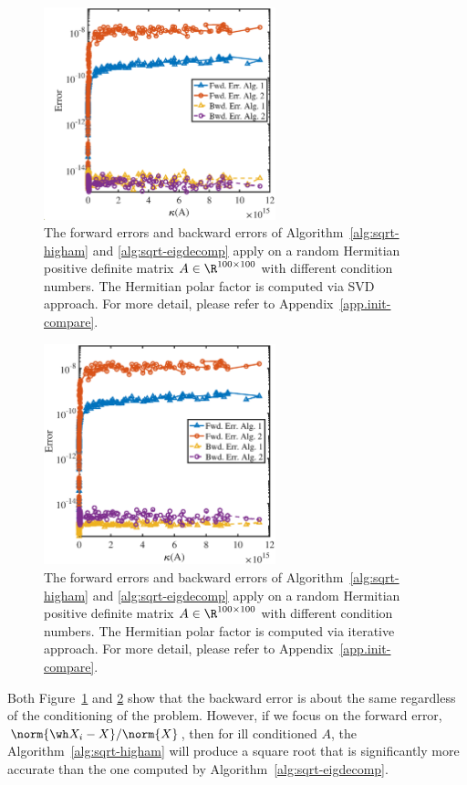 \begin{figure}[h]
\centering
\includegraphics[width=0.6\textwidth]{figs/init_comp_svd_eig.eps}
\caption[Behavior of forward and backward errors of computed square
root.]{
  The forward errors and backward errors of
  Algorithm~\ref{alg:sqrt-higham} and \ref{alg:sqrt-eigdecomp} apply on a
  random Hermitian positive definite matrix $A\in\R^{100\times 100}$ with
  different condition numbers.
  The Hermitian polar factor is computed via SVD approach.
  For more detail, please refer to Appendix~\ref{app.init-compare}.}
\label{fig.init-compare-svd}
\end{figure}

\begin{figure}[h]
\centering
\includegraphics[width=0.6\textwidth]{figs/init_comp_newton_eig.eps}
\caption[Behavior of forward and backward errors of computed square
root.]{
  The forward errors and backward errors of
  Algorithm~\ref{alg:sqrt-higham} and \ref{alg:sqrt-eigdecomp} apply on a
  random Hermitian positive definite matrix $A\in\R^{100\times 100}$ with
  different condition numbers.
  The Hermitian polar factor is computed via iterative approach.
  For more detail, please refer to Appendix~\ref{app.init-compare}.}
\label{fig.init-compare-newton}
\end{figure}

Both Figure~\ref{fig.init-compare-svd} and \ref{fig.init-compare-newton}
show that the backward error is about the same regardless of the
conditioning of the problem. However, if we focus on the forward error,
$\norm{\wh X_{i} - X}/\norm{X}$, then for ill conditioned $A$, the
Algorithm~\ref{alg:sqrt-higham} will produce a square root that is 
significantly more accurate than the one computed by 
Algorithm~\ref{alg:sqrt-eigdecomp}. 



